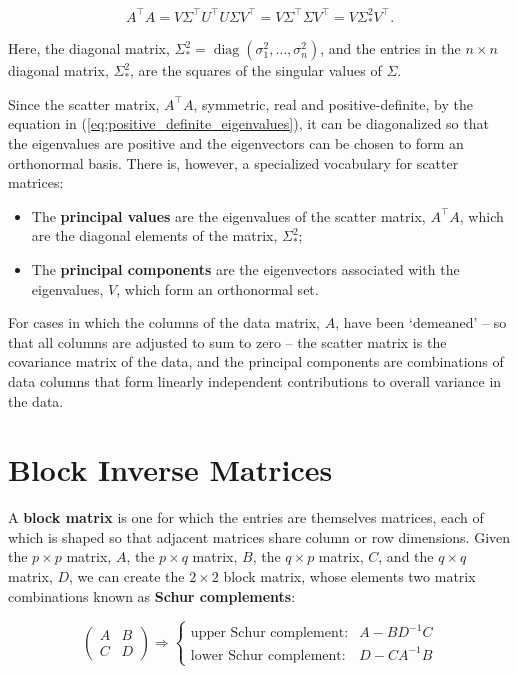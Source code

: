 \documentclass[12pt, twoside, draft]{article}
\begin{document}
\begin{equation}\label{eq:principle_components_analysis}
A^\top A = V \Sigma^\top U^\top U \Sigma V^\top = V \Sigma^\top \Sigma V^\top = V \Sigma_*^2 V^\top.
\end{equation}

Here, the diagonal matrix, $\Sigma_*^2 = \operatorname{diag}(\sigma_1^2, \ldots, \sigma_n^2)$, and the entries in the $n \times n$ diagonal matrix, $\Sigma_*^2$, are the squares of the singular values of $\Sigma$.

Since the scatter matrix, $A^\top A$, symmetric, real and positive-definite, by the equation in (\ref{eq:positive_definite_eigenvalues}), it can be diagonalized so that the eigenvalues are positive and the eigenvectors can be chosen to form an orthonormal basis.  There is, however, a specialized vocabulary for scatter matrices:
\begin{itemize}[noitemsep]
\item The \textbf{principal values} are the eigenvalues of the scatter matrix, $A^\top A$, which are the diagonal elements of the matrix, $\Sigma_*^2$;
\item The \textbf{principal components} are the eigenvectors associated with the eigenvalues, $V$, which form an orthonormal set.
\end{itemize}

For cases in which the columns of the data matrix, $A$, have been `demeaned' -- so that all columns are adjusted to sum to zero -- the scatter matrix is the covariance matrix of the data, and the principal components are combinations of data columns that form linearly independent contributions to overall variance in the data.

\section{Block Inverse Matrices}\label{sec:block-inverse}
A \textbf{block matrix} is one for which the entries are themselves matrices, each of which is shaped so that adjacent matrices share column or row dimensions.  Given the $p \times p$ matrix, $A$, the $p \times q$ matrix, $B$, the $q \times p$ matrix, $C$, and the $q \times q$ matrix, $D$, we can create the $2 \times 2$ block matrix, whose elements two matrix combinations known as \textbf{Schur complements}:

\begin{equation}\label{eq:Schur_complements}
\begin{pmatrix}
A & B \\
C & D
\end{pmatrix} \Rightarrow \begin{cases} \text{upper Schur complement:} & A - BD^{-1}C \\ \text{lower Schur complement:} & D - CA^{-1}B  \end{cases}
\end{equation}
\end{document}

